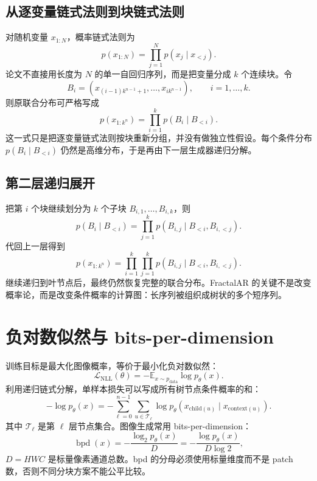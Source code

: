 \documentclass[UTF8,12pt,a4paper,fontset=none]{ctexart}
\numberwithin{equation}{section}
\newcommand{\E}{\mathbb{E}}
\newcommand{\Loss}{\mathcal{L}}
\begin{document}
\subsection{从逐变量链式法则到块链式法则}
对随机变量 $x_{1:N}$，概率链式法则为
\begin{equation}
 p(x_{1:N})=\prod_{j=1}^{N}p(x_j\mid x_{<j}).
\end{equation}
论文不直接用长度为 $N$ 的单一自回归序列，而是把变量分成 $k$ 个连续块。令
\begin{equation}
 B_i=\left(x_{(i-1)k^{n-1}+1},\ldots,x_{ik^{n-1}}\right),\qquad i=1,\ldots,k.
\end{equation}
则原联合分布可严格写成
\begin{equation}
 \boxed{p(x_{1:k^n})=\prod_{i=1}^{k}p\!\left(B_i\mid B_{<i}\right)}.
\end{equation}
这一式只是把逐变量链式法则按块重新分组，并没有做独立性假设。每个条件分布 $p(B_i\mid B_{<i})$ 仍然是高维分布，于是再由下一层生成器递归分解。

\subsection{第二层递归展开}
把第 $i$ 个块继续划分为 $k$ 个子块 $B_{i,1},\ldots,B_{i,k}$，则
\begin{equation}
 p(B_i\mid B_{<i})
 =\prod_{j=1}^{k}p\!\left(B_{i,j}\mid B_{<i},B_{i,<j}\right).
\end{equation}
代回上一层得到
\begin{equation}
 p(x_{1:k^n})
 =\prod_{i=1}^{k}\prod_{j=1}^{k}
 p\!\left(B_{i,j}\mid B_{<i},B_{i,<j}\right).
\end{equation}
继续递归到叶节点后，最终仍然恢复完整的联合分布。FractalAR 的关键不是改变概率论，而是改变条件概率的计算图：长序列被组织成树状的多个短序列。

\section{负对数似然与 bits-per-dimension}
训练目标是最大化图像概率，等价于最小化负对数似然：
\begin{equation}
 \Loss_{\mathrm{NLL}}(\theta)
 =-\E_{x\sim p_{\mathrm{data}}}\log p_\theta(x).
\end{equation}
利用递归链式分解，单样本损失可以写成所有树节点条件概率的和：
\begin{equation}
 -\log p_\theta(x)
 =-\sum_{\ell=0}^{n-1}\sum_{u\in\mathcal{T}_\ell}
 \log p_\theta\!\left(x_{\mathrm{child}(u)}\mid x_{\mathrm{context}(u)}\right).
\end{equation}
其中 $\mathcal{T}_\ell$ 是第 $\ell$ 层节点集合。图像生成常用 bits-per-dimension：
\begin{equation}
 \operatorname{bpd}(x)
 =-\frac{\log_2 p_\theta(x)}{D}
 =-\frac{\log p_\theta(x)}{D\log 2},
\end{equation}
$D=HWC$ 是标量像素通道总数。bpd 的分母必须使用标量维度而不是 patch 数，否则不同分块方案不能公平比较。
\end{document}
